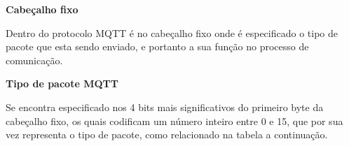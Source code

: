 \documentclass[12pt, a4paper]{article}
\begin{document}
\textbf{Cabeçalho fixo}

Dentro do protocolo MQTT é no cabeçalho fixo onde é especificado o tipo de pacote que esta sendo enviado, e portanto a sua função no processo de comunicação.

\begin{table}[htb!]\caption{Estrutura do cabeçalho fixo utilizado no protocolo MQTT.}
\centering
{}
\end{table}

\cleardoublepage

\textbf{Tipo de pacote MQTT}

Se encontra especificado nos 4 bits mais significativos do primeiro byte da cabeçalho fixo, os quais codificam um número inteiro entre 0 e 15, que por sua vez representa o tipo de pacote, como relacionado na tabela a continuação.
\end{document}
